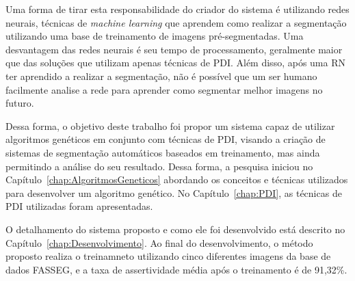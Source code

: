 \documentclass[12pt,oneside,a4paper,english,french,spanish,brazil,]{abntex2}
\begin{document}
Uma forma de tirar esta responsabilidade do criador do sistema é utilizando redes neurais, técnicas de \textit{machine learning} que aprendem como realizar a segmentação utilizando uma base de treinamento de imagens pré-segmentadas. Uma desvantagem das redes neurais é seu tempo de processamento, geralmente maior que das soluções que utilizam apenas técnicas de PDI. Além disso, após uma RN ter aprendido a realizar a segmentação, não é possível que um ser humano facilmente analise a rede para aprender como segmentar melhor imagens no futuro.

Dessa forma, o objetivo deste trabalho foi propor um sistema capaz de utilizar algoritmos genéticos em conjunto com técnicas de PDI, visando a criação de sistemas de segmentação automáticos baseados em treinamento, mas ainda permitindo a análise do seu resultado. Dessa forma, a pesquisa iniciou no Capítulo~\ref{chap:AlgoritmosGeneticos} abordando os conceitos e técnicas utilizados para desenvolver um algoritmo genético. No Capítulo~\ref{chap:PDI}, as técnicas de PDI utilizadas foram apresentadas.

O detalhamento do sistema proposto e como ele foi desenvolvido está descrito no Capítulo~\ref{chap:Desenvolvimento}. Ao final do desenvolvimento, o método proposto realiza o treinamneto utilizando cinco diferentes imagens da base de dados FASSEG, e a taxa de assertividade média após o treinamento é de 91,32\%.

\postextual






\printindex
\end{document}
